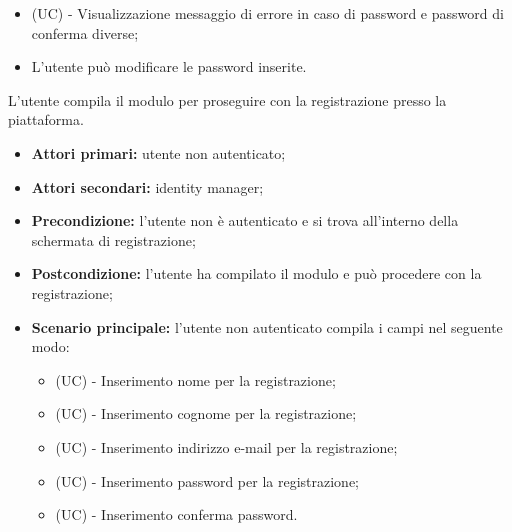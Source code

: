 \begin{itemize}
\begin{enumerate}
\begin{itemize}
			\item (UC) - Visualizzazione messaggio di errore in caso di password e password di conferma diverse;
			\item L'utente può modificare le password inserite.
		\end{itemize}
	\end{enumerate}
\end{itemize}

L'utente compila il modulo per proseguire con la registrazione presso la piattaforma.
\begin{itemize}
	\item \textbf{Attori primari:} utente non autenticato;
	\item \textbf{Attori secondari:} identity manager;
	\item \textbf{Precondizione:} l'utente non è autenticato e si trova all'interno della schermata di registrazione;
	\item \textbf{Postcondizione:} l'utente ha compilato il modulo e può procedere con la registrazione;
	\item \textbf{Scenario principale:} l'utente non autenticato compila i campi nel seguente modo:
	\begin{itemize}
		\item (UC) - Inserimento nome per la registrazione;
		\item (UC) - Inserimento cognome per la registrazione;
		\item (UC) - Inserimento indirizzo e-mail per la registrazione;
		\item (UC) - Inserimento password per la registrazione;
		\item (UC) - Inserimento conferma password.
	\end{itemize}
\end{itemize}

